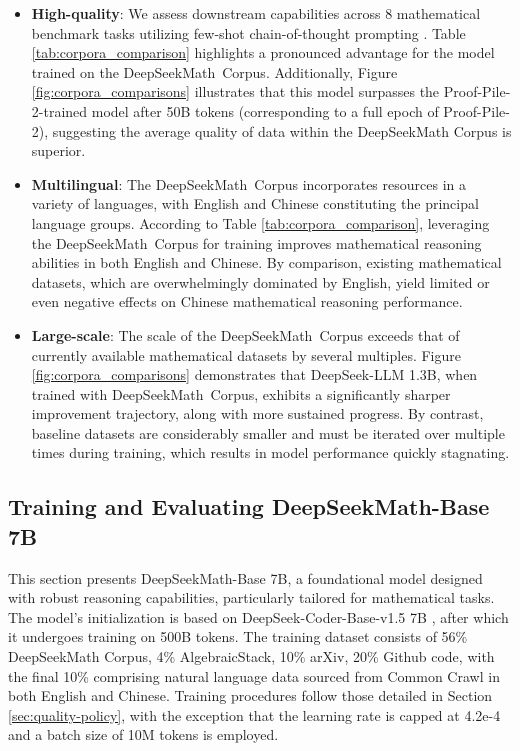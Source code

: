 \begin{itemize}[topsep=0pt]
\begin{itemize}[topsep=0pt]
    \item \textbf{High-quality}: 
    We assess downstream capabilities across 8 mathematical benchmark tasks utilizing few-shot chain-of-thought prompting \cite{cot}. Table \ref{tab:corpora_comparison} highlights a pronounced advantage for the model trained on the DeepSeekMath~Corpus. Additionally, Figure \ref{fig:corpora_comparisons} illustrates that this model surpasses the Proof-Pile-2-trained model after 50B tokens (corresponding to a full epoch of Proof-Pile-2), suggesting the average quality of data within the DeepSeekMath Corpus is superior.
    \item \textbf{Multilingual}:
    The DeepSeekMath~Corpus incorporates resources in a variety of languages, with English and Chinese constituting the principal language groups. According to Table \ref{tab:corpora_comparison}, leveraging the DeepSeekMath~Corpus for training improves mathematical reasoning abilities in both English and Chinese. By comparison, existing mathematical datasets, which are overwhelmingly dominated by English, yield limited or even negative effects on Chinese mathematical reasoning performance.
    \item \textbf{Large-scale}: 
    The scale of the DeepSeekMath~Corpus exceeds that of currently available mathematical datasets by several multiples. Figure \ref{fig:corpora_comparisons} demonstrates that DeepSeek-LLM 1.3B, when trained with DeepSeekMath~Corpus, exhibits a significantly sharper improvement trajectory, along with more sustained progress. By contrast, baseline datasets are considerably smaller and must be iterated over multiple times during training, which results in model performance quickly stagnating.
\end{itemize}

\subsection{Training and Evaluating DeepSeekMath-Base 7B}

This section presents DeepSeekMath-Base 7B, a foundational model designed with robust reasoning capabilities, particularly tailored for mathematical tasks. The model's initialization is based on DeepSeek-Coder-Base-v1.5 7B \citep{deepseek-coder}, after which it undergoes training on 500B tokens. The training dataset consists of 56\% DeepSeekMath Corpus, 4\% AlgebraicStack, 10\% arXiv, 20\% Github code, with the final 10\% comprising natural language data sourced from Common Crawl in both English and Chinese. Training procedures follow those detailed in Section \ref{sec:quality-policy}, with the exception that the learning rate is capped at 4.2e-4 and a batch size of 10M tokens is employed.


\end{itemize}
